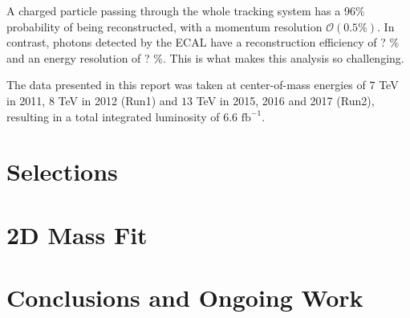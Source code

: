 \documentclass[oneside,12pt]{article}
\begin{document}
A charged particle passing through the whole tracking system has a 96\%
probability of being reconstructed, with a momentum resolution
$\mathcal{O}(0.5\%)$. In contrast, photons detected by the ECAL have a
reconstruction efficiency of ? \% and an energy resolution of ? \%. This is what
makes this analysis so challenging.

The data presented in this report was taken at center-of-mass energies of $7$
TeV in 2011, $8$ TeV in 2012 (Run1) and $13$ TeV in 2015, 2016 and 2017 (Run2),
resulting in a total integrated luminosity of $6.6$ $\text{fb}^{-1}$.

\section{Selections} \label{selections}
\section{2D Mass Fit} \label{massfit}
\section{Conclusions and Ongoing Work} \label{conclusion}

\printbibliography[heading=bibintoc,{title=References}]
\end{document}

